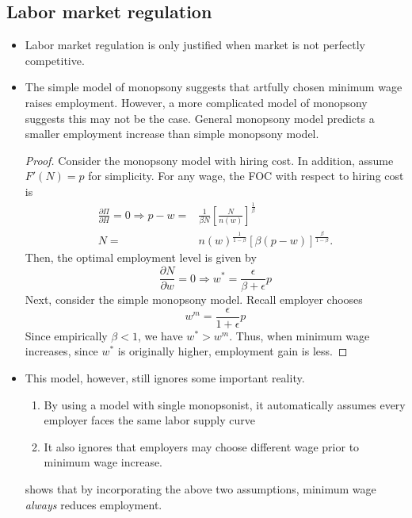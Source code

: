 \documentclass[a4paper, 12pt]{article}
\begin{document}
\subsection{Labor market regulation}
\begin{itemize}
\item Labor market regulation is only justified when market is not perfectly competitive.
\item The simple model of monopsony suggests that artfully chosen minimum wage raises employment. However, a more complicated model of monopsony suggests this may not be the case. General monopsony model predicts a smaller employment increase than simple monopsony model.
\begin{proof}  
Consider the monopsony model with hiring cost. In addition, assume $F'(N)=p$ for simplicity. For any wage, the FOC with respect to hiring cost is
\begin{align*}
\frac{\partial \Pi}{\partial H} = 0
\Rightarrow
p-w =& \frac{1}{\beta N}
\left[
\frac{N}{n(w)}
\right]
^
{
\frac{1}{\beta}
} \\
N =&
n(w)^\frac{1}{1-\beta}
[
\beta
(p-w)
]^
\frac{\beta}{1-\beta}.
\end{align*}
Then, the optimal employment level is given by
\begin{equation}
\frac{\partial N}{\partial w} = 0
\Rightarrow
w^* = \frac{\epsilon}{\beta+\epsilon}p
\end{equation}
Next, consider the simple monopsony model. Recall employer chooses
\begin{equation}
w^m = \frac{\epsilon}{1+\epsilon}p
\end{equation}
Since empirically $\beta<1$, we have $w^*>w^m$. Thus, when minimum wage increases, since $w^*$ is originally higher, employment gain is less.
\end{proof}
\item This model, however, still ignores some important reality.
\begin{enumerate}
\item By using a model with single monopsonist, it automatically assumes every employer faces the same labor supply curve
\item It also ignores that employers may choose different wage prior to minimum wage increase.
\end{enumerate}
\cite{manning2003monopsony} shows that by incorporating the above two assumptions, minimum wage \textit{always} reduces employment.
\end{itemize}
\end{document}
